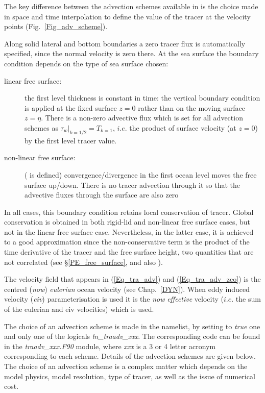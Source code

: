 The key difference between the advection schemes available in \NEMO is the choice 
made in space and time interpolation to define the value of the tracer at the 
velocity points (Fig.~\ref{Fig_adv_scheme}). 

Along solid lateral and bottom boundaries a zero tracer flux is automatically 
specified, since the normal velocity is zero there. At the sea surface the 
boundary condition depends on the type of sea surface chosen: 
\begin{description}
\item [linear free surface:] the first level thickness is constant in time: 
the vertical boundary condition is applied at the fixed surface $z=0$ 
rather than on the moving surface $z=\eta$. There is a non-zero advective 
flux which is set for all advection schemes as 
$\left. {\tau _w } \right|_{k=1/2} =T_{k=1} $, $i.e.$ 
the product of surface velocity (at $z=0$) by the first level tracer value.
\item [non-linear free surface:] ( is defined) 
convergence/divergence in the first ocean level moves the free surface 
up/down. There is no tracer advection through it so that the advective 
fluxes through the surface are also zero 
\end{description}
In all cases, this boundary condition retains local conservation of tracer. 
Global conservation is obtained in both rigid-lid and non-linear free surface 
cases, but not in the linear free surface case. Nevertheless, in the latter
case, it is achieved to a good approximation since the non-conservative 
term is the product of the time derivative of the tracer and the free surface 
height, two quantities that are not correlated (see \S\ref{PE_free_surface}, 
and also \citet{Roullet_Madec_JGR00,Griffies_al_MWR01,Campin2004}).

The velocity field that appears in (\ref{Eq_tra_adv}) and (\ref{Eq_tra_adv_zco}) 
is the centred (\textit{now}) \textit{eulerian} ocean velocity (see Chap.~\ref{DYN}). 
When eddy induced velocity (\textit{eiv}) parameterisation is used it is the \textit{now} 
\textit{effective} velocity ($i.e.$ the sum of the eulerian and eiv velocities) which is used.

The choice of an advection scheme is made in the \textit{} namelist, by 
setting to \textit{true} one and only one of the logicals \textit{ln\_traadv\_xxx}. The 
corresponding code can be found in the \textit{traadv\_xxx.F90} module, where 
\textit{xxx} is a 3 or 4 letter acronym corresponding to each scheme. Details 
of the advection schemes are given below. The choice of an advection scheme 
is a complex matter which depends on the model physics, model resolution, 
type of tracer, as well as the issue of numerical cost. 

